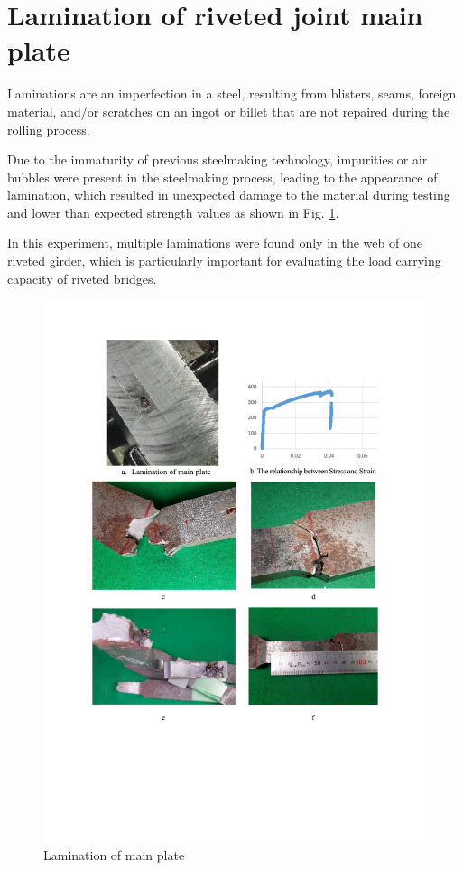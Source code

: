 \section{Lamination of riveted joint main plate}

Laminations are an imperfection in a steel, resulting from blisters, seams, foreign material, and/or scratches on an ingot or billet that are not repaired during the rolling process.

Due to the immaturity of previous steelmaking technology, impurities or air bubbles were present in the steelmaking process, leading to the appearance of lamination, which resulted in unexpected damage to the material during testing and lower than expected strength values as shown in Fig. \ref{fig-lami}.

In this experiment, multiple laminations were found only in the web of one riveted girder, which is particularly important for evaluating the load carrying capacity of riveted bridges.

\begin{figure}
    \centering
    \includegraphics[width=1\linewidth]{imgs//app2/fig-lami.pdf}
    \caption{Lamination of main plate}
    \label{fig-lami}
\end{figure}